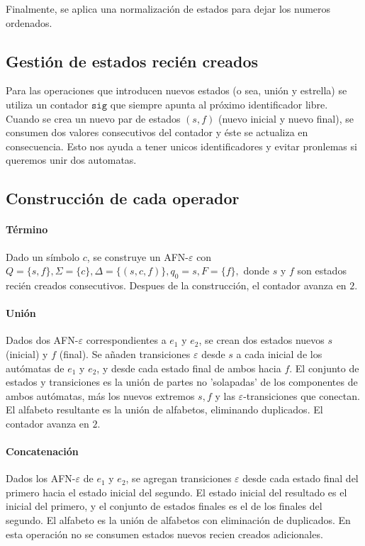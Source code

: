 Finalmente, se aplica una normalización de estados para dejar los numeros ordenados.

\subsection{Gestión de estados recién creados}

Para las operaciones que introducen nuevos estados (o sea, unión y estrella) se utiliza un contador $\texttt{sig}$ que siempre apunta al próximo identificador libre. Cuando se crea un nuevo par de estados $(s, f)$ (nuevo inicial y nuevo final), se consumen dos valores consecutivos del contador y éste se actualiza en consecuencia. Esto nos ayuda a tener unicos identificadores y evitar pronlemas si queremos unir dos automatas.

\subsection{Construcción de cada operador}

\paragraph{Término}
Dado un símbolo $c$, se construye un AFN-$\varepsilon$ con $Q = \{s, f\}, \Sigma = \{c\},\Delta = \{(s, c, f)\}, q_0 = s, F = \{f\},
$
donde $s$ y $f$ son estados recién creados consecutivos. Despues de la construcción, el contador avanza en $2$.

\paragraph{Unión}
Dados dos AFN-$\varepsilon$ correspondientes a $e_1$ y $e_2$, se crean dos estados nuevos $s$ (inicial) y $f$ (final). Se añaden transiciones $\varepsilon$ desde $s$ a cada inicial de los autómatas de $e_1$ y $e_2$, y desde cada estado final de ambos hacia $f$. El conjunto de estados y transiciones es la unión de partes no 'solapadas' de los componentes de ambos autómatas, más los nuevos extremos $s, f$ y las $\varepsilon$-transiciones que conectan. El alfabeto resultante es la unión de alfabetos, eliminando duplicados. El contador avanza en $2$.

\paragraph{Concatenación}
Dados los AFN-$\varepsilon$ de $e_1$ y $e_2$, se agregan transiciones $\varepsilon$ desde cada estado final del primero hacia el estado inicial del segundo. El estado inicial del resultado es el inicial del primero, y el conjunto de estados finales es el de los finales del segundo. El alfabeto es la unión de alfabetos con eliminación de duplicados. En esta operación no se consumen estados nuevos recien creados adicionales.

